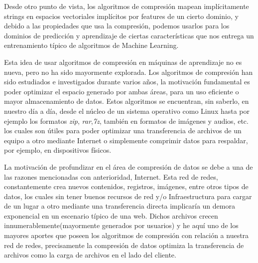 


Desde otro punto de vista, los algoritmos de compresión mapean implícitamente strings en espacios vectoriales implícitos por features de un cierto dominio, y debido a las propiedades que usa la  compresión, podemos usarlos para los dominios de predicción y aprendizaje de ciertas características que nos entrega un entrenamiento típico de algoritmos de Machine Learning.

Esta idea de usar algoritmos de compresión en máquinas de aprendizaje no es nueva, pero no ha sido mayormente explorada. Los algoritmos de compresión han sido estudiados e investigados durante varios años, la motivación fundamental es poder optimizar el espacio generado por ambas áreas, para un uso eficiente o mayor almacenamiento de datos. Estos algoritmos se encuentran, sin saberlo, en nuestro día a día, desde el núcleo de un sistema operativo como Linux hasta por ejemplo los formatos \emph{zip}, \emph{rar},\emph{7z}, también en formatos de imágenes y audios, etc. los cuales son útiles para poder optimizar una transferencia de archivos de un equipo a otro mediante Internet o simplemente comprimir datos para respaldar, por ejemplo, en dispositivos físicos. 

La motivación de profundizar en el área de compresión de datos se debe a una de las razones mencionadas con anterioridad, Internet. Esta red de redes, constantemente crea nuevos contenidos, registros, imágenes, entre otros tipos de datos,  los cuales sin tener buenos recursos de red y/o Infraestructura para cargar de un lugar a otro mediante una transferencia directa implicaría un demora exponencial en un escenario típico de una web. Dichos archivos crecen innumerablemente(mayormente generados por usuarios) y he aquí uno de los mayores aportes que poseen los algoritmos de compresión con relación a nuestra red de redes, precisamente la compresión de datos optimiza la transferencia de archivos como la carga de archivos en el lado del cliente.

